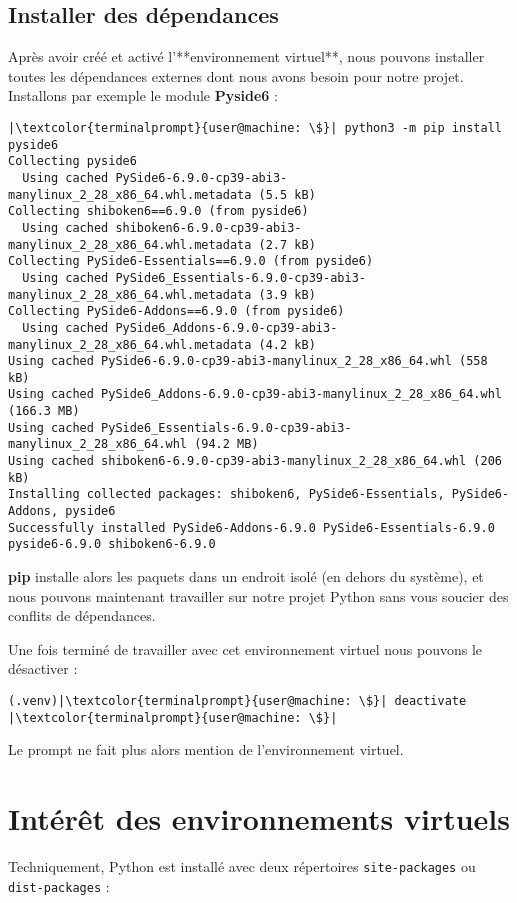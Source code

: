 \subsection*{Installer des dépendances}
Après avoir créé et activé l'**environnement virtuel**, nous pouvons installer toutes les dépendances externes dont nous avons besoin pour notre projet. Installons par exemple le module \textbf{Pyside6} :
\begin{lstlisting}[style=terminal]
|\textcolor{terminalprompt}{user@machine: \$}| python3 -m pip install pyside6
Collecting pyside6
  Using cached PySide6-6.9.0-cp39-abi3-manylinux_2_28_x86_64.whl.metadata (5.5 kB)
Collecting shiboken6==6.9.0 (from pyside6)
  Using cached shiboken6-6.9.0-cp39-abi3-manylinux_2_28_x86_64.whl.metadata (2.7 kB)
Collecting PySide6-Essentials==6.9.0 (from pyside6)
  Using cached PySide6_Essentials-6.9.0-cp39-abi3-manylinux_2_28_x86_64.whl.metadata (3.9 kB)
Collecting PySide6-Addons==6.9.0 (from pyside6)
  Using cached PySide6_Addons-6.9.0-cp39-abi3-manylinux_2_28_x86_64.whl.metadata (4.2 kB)
Using cached PySide6-6.9.0-cp39-abi3-manylinux_2_28_x86_64.whl (558 kB)
Using cached PySide6_Addons-6.9.0-cp39-abi3-manylinux_2_28_x86_64.whl (166.3 MB)
Using cached PySide6_Essentials-6.9.0-cp39-abi3-manylinux_2_28_x86_64.whl (94.2 MB)
Using cached shiboken6-6.9.0-cp39-abi3-manylinux_2_28_x86_64.whl (206 kB)
Installing collected packages: shiboken6, PySide6-Essentials, PySide6-Addons, pyside6
Successfully installed PySide6-Addons-6.9.0 PySide6-Essentials-6.9.0 pyside6-6.9.0 shiboken6-6.9.0
\end{lstlisting}

\textbf{pip} installe alors les paquets dans un endroit isolé (en dehors du système), et nous pouvons maintenant travailler sur notre projet Python sans vous soucier des conflits de dépendances.

Une fois terminé de travailler avec cet environnement virtuel nous pouvons le désactiver :
\begin{lstlisting}[style=terminal]
(.venv)|\textcolor{terminalprompt}{user@machine: \$}| deactivate
|\textcolor{terminalprompt}{user@machine: \$}|
\end{lstlisting}

Le prompt ne fait plus alors mention de l'environnement virtuel.

\section{Intérêt des environnements virtuels}
Techniquement, Python est installé avec deux répertoires \texttt{site-packages} ou \\
\texttt{dist-packages} :

